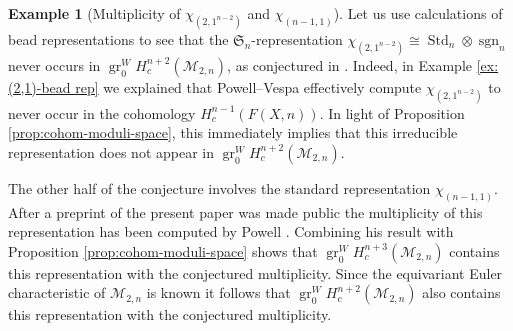 \documentclass[12pt]{article}
\newcommand{\SymGroup}[1][n]{\mathfrak{S}_{#1}}
\newcommand{\Specht}[1]{\chi_{#1}}
\newcommand{\ModuliCurve}[1]{\mathcal{M}_{#1}}
\newcommand{\sgn}[1][n]{\operatorname{sgn}_{#1}}
\DeclareMathOperator{\gr}{gr}
\theoremstyle{plain}
\theoremstyle{definition}
\newtheorem{expl}[thm]{Example}
\theoremstyle{remark}
\begin{document}
\begin{expl}[Multiplicity of $\Specht{(2,1^{n-2})}$ and $\Specht{(n-1,1)}$]\label{ex:BCGY conjecture}
Let us use calculations of bead representations to see that the $\SymGroup$-representation $\Specht{(2,1^{n-2})}\cong \operatorname{Std}_n\otimes \sgn$ never occurs in $\gr^W_0 H^{n+2}_c(\ModuliCurve{2,n})$, as conjectured in \cite[Conj. 3.5]{BCGY21}. Indeed, in Example \ref{ex:(2,1)-bead rep} we explained that Powell--Vespa effectively compute $\Specht{(2,1^{n-2})}$ to never occur in the cohomology $H^{n-1}_c(F(X,n))$. In light of Proposition \ref{prop:cohom-moduli-space}, this immediately implies that this irreducible representation does not appear in $\gr^W_0 H^{n+2}_c(\ModuliCurve{2,n})$.

The other half of the conjecture involves the standard representation $\Specht{(n-1,1)}$. After a preprint of the present paper was made public the multiplicity of this representation has been computed by Powell \cite{PowBabyBead}. Combining his result with Proposition \ref{prop:cohom-moduli-space} shows that $\gr^W_0 H^{n+3}_c(\ModuliCurve{2,n})$ contains this representation with the conjectured multiplicity. Since the equivariant Euler characteristic of $\ModuliCurve{2,n}$ is known it follows that $\gr^W_0 H^{n+2}_c(\ModuliCurve{2,n})$ also contains this representation with the conjectured multiplicity.%
\end{expl}
\end{document}

